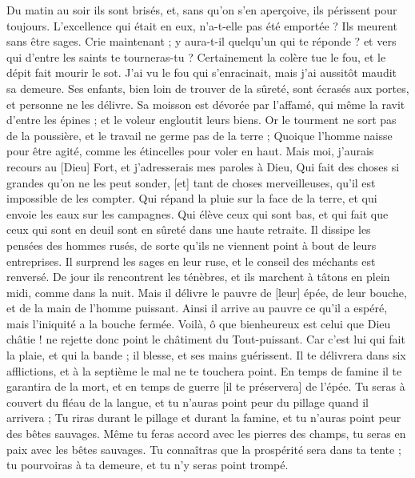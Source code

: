 \begin{multicols}{2}
Du matin au soir ils sont brisés, et, sans qu'on s'en aperçoive, ils périssent pour toujours.
L'excellence qui était en eux, n'a-t-elle pas été emportée ? Ils meurent sans être sages.
\VerseOne{}Crie maintenant ; y aura-t-il quelqu'un qui te réponde ? et vers qui d'entre les saints te tourneras-tu ?
Certainement la colère tue le fou, et le dépit fait mourir le sot.
J'ai vu le fou qui s'enracinait, mais j'ai aussitôt maudit sa demeure.
Ses enfants, bien loin de trouver de la sûreté, sont écrasés aux portes, et personne ne les délivre.
Sa moisson est dévorée par l'affamé, qui même la ravit d'entre les épines ; et le voleur engloutit leurs biens.
Or le tourment ne sort pas de la poussière, et le travail ne germe pas de la terre ;
Quoique l'homme naisse pour être agité, comme les étincelles pour voler en haut.
Mais moi, j'aurais recours au [Dieu] Fort, et j'adresserais mes paroles à Dieu,
Qui fait des choses si grandes qu'on ne les peut sonder, [et] tant de choses merveilleuses, qu'il est impossible de les compter.
Qui répand la pluie sur la face de la terre, et qui envoie les eaux sur les campagnes.
Qui élève ceux qui sont bas, et qui fait que ceux qui sont en deuil sont en sûreté dans une haute retraite.
Il dissipe les pensées des hommes rusés, de sorte qu'ils ne viennent point à bout de leurs entreprises.
Il surprend les sages en leur ruse, et le conseil des méchants est renversé.
De jour ils rencontrent les ténèbres, et ils marchent à tâtons en plein midi, comme dans la nuit.
Mais il délivre le pauvre de [leur] épée, de leur bouche, et de la main de l'homme puissant.
Ainsi il arrive au pauvre ce qu'il a espéré, mais l'iniquité a la bouche fermée.
Voilà, ô que bienheureux est celui que Dieu châtie ! ne rejette donc point le châtiment du Tout-puissant.
Car c'est lui qui fait la plaie, et qui la bande ; il blesse, et ses mains guérissent.
Il te délivrera dans six afflictions, et à la septième le mal ne te touchera point.
En temps de famine il te garantira de la mort, et en temps de guerre [il te préservera] de l'épée.
Tu seras à couvert du fléau de la langue, et tu n'auras point peur du pillage quand il arrivera ;
Tu riras durant le pillage et durant la famine, et tu n'auras point peur des bêtes sauvages.
Même tu feras accord avec les pierres des champs, tu seras en paix avec les bêtes sauvages.
Tu connaîtras que la prospérité sera dans ta tente ; tu pourvoiras à ta demeure, et tu n'y seras point trompé.

\end{multicols}
